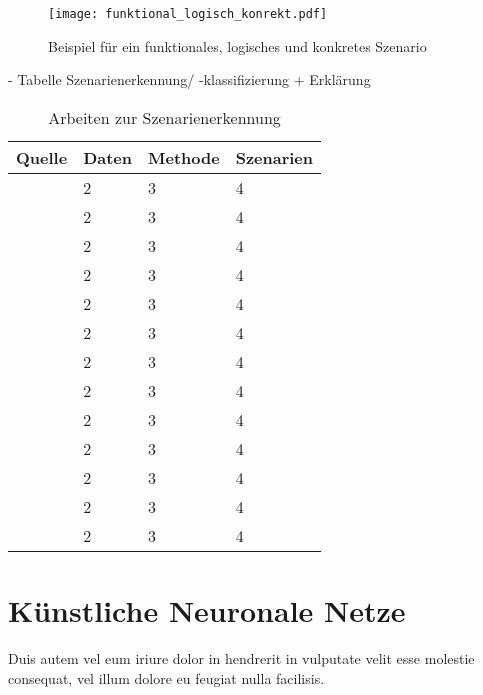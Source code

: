 \begin{figure}[h]
\centering
\texttt{[image: funktional\_logisch\_konrekt.pdf]}
\caption{Beispiel für ein funktionales, logisches und konkretes Szenario \cite{bagschik2017szenarien}}
\label{fig_funktional_logisch_konrekt}
\end{figure}





- Tabelle Szenarienerkennung/ -klassifizierung + Erklärung

\begin{table}[h]
\centering
\begin{tabular}{p{1.5cm} p{3.5cm} p{3.5cm} p{3.5cm}}
Quelle & Daten & Methode & Szenarien \\
\hline
\cite{xie2018driving} & 2 & 3 & 4 \\
\cite{zheng2017lane} & 2 & 3 & 4 \\
\cite{sun2017robust} & 2 & 3 & 4 \\
\cite{gruner2017spatiotemporal} & 2 & 3 & 4 \\
\cite{cervantes2016vehicle} & 2 & 3 & 4 \\
\cite{woo2016manoeuvre} & 2 & 3 & 4 \\
\cite{camlica2016feature} & 2 & 3 & 4 \\
\cite{zheng2016drivers} & 2 & 3 & 4 \\
\cite{arroyo2016adaptive} & 2 & 3 & 4 \\
\cite{zheng2015non} & 2 & 3 & 4 \\
\cite{li2015lane} & 2 & 3 & 4 \\
\cite{nilsson2015rule} & 2 & 3 & 4 \\
\cite{zheng2014threshold} & 2 & 3 & 4 \\
\hline
\end{tabular}
\caption{Arbeiten zur Szenarienerkennung}
\label{tab_szenarienerkennung}
\end{table} 


\section{Künstliche Neuronale Netze}
\label{grundlagen_nn}

Duis autem vel eum iriure dolor in hendrerit in vulputate velit esse molestie consequat, vel illum dolore eu feugiat nulla facilisis.


